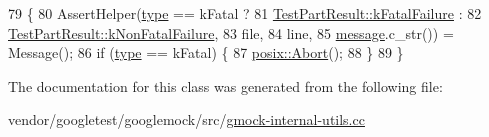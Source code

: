 \begin{DoxyCode}
79                                                     \{
80     AssertHelper(\hyperlink{namespaceupload_a4fc56f0dd6613be15c3c4dc3af3619ce}{type} == kFatal ?
81                  \hyperlink{classtesting_1_1TestPartResult_a65ae656b33fdfdfffaf34858778a52d5ae1bf0b610b697a43fee97628cdab4ea1}{TestPartResult::kFatalFailure} :
82                  \hyperlink{classtesting_1_1TestPartResult_a65ae656b33fdfdfffaf34858778a52d5a00a755614f8ec3f78b2e951f8c91cd92}{TestPartResult::kNonFatalFailure},
83                  file,
84                  line,
85                  \hyperlink{namespacegtest__output__test_ac696d0798ad7d08cb2e61070824750e2}{message}.c\_str()) = Message();
86     \textcolor{keywordflow}{if} (\hyperlink{namespaceupload_a4fc56f0dd6613be15c3c4dc3af3619ce}{type} == kFatal) \{
87       \hyperlink{namespacetesting_1_1internal_1_1posix_a69b8278c59359dd6a6f941b4643db9fb}{posix::Abort}();
88     \}
89   \}
\end{DoxyCode}


The documentation for this class was generated from the following file\+:\begin{DoxyCompactItemize}
\item 
vendor/googletest/googlemock/src/\hyperlink{gmock-internal-utils_8cc}{gmock-\/internal-\/utils.\+cc}\end{DoxyCompactItemize}
